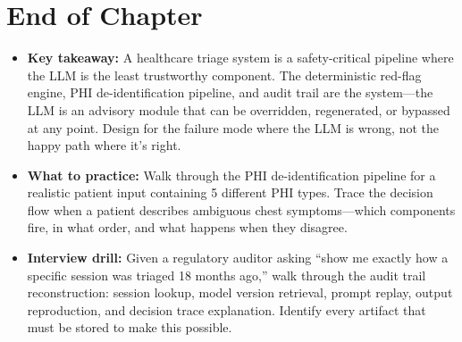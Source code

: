\section*{End of Chapter}
\begin{itemize}
  \item \textbf{Key takeaway:} A healthcare triage system is a safety-critical pipeline where the LLM is the least trustworthy component. The deterministic red-flag engine, PHI de-identification pipeline, and audit trail are the system---the LLM is an advisory module that can be overridden, regenerated, or bypassed at any point. Design for the failure mode where the LLM is wrong, not the happy path where it's right.
  \item \textbf{What to practice:} Walk through the PHI de-identification pipeline for a realistic patient input containing 5 different PHI types. Trace the decision flow when a patient describes ambiguous chest symptoms---which components fire, in what order, and what happens when they disagree.
  \item \textbf{Interview drill:} Given a regulatory auditor asking ``show me exactly how a specific session was triaged 18 months ago,'' walk through the audit trail reconstruction: session lookup, model version retrieval, prompt replay, output reproduction, and decision trace explanation. Identify every artifact that must be stored to make this possible.
\end{itemize}
